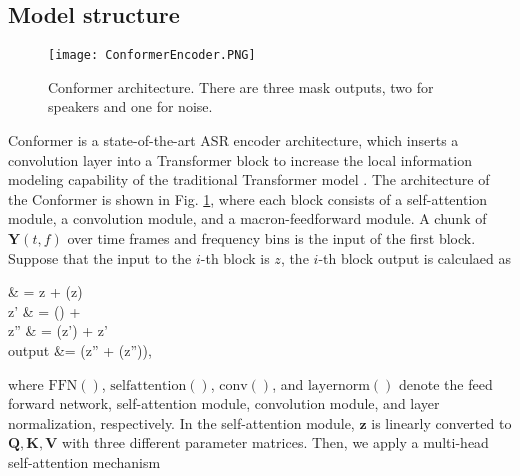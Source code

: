 \documentclass{article}
\begin{document}
	\subsection{Model structure}
	
	\begin{figure}[t]		
		\begin{center}
			\texttt{[image: ConformerEncoder.PNG]}
		\end{center}
		
		\caption{Conformer architecture. There are three mask outputs, two for speakers and one for noise.}\label{fig:conformer} 
		\vspace{-4.5mm}
		
	\end{figure} 
	
	Conformer \cite{gulati2020conformer} is a state-of-the-art ASR encoder architecture, which inserts a convolution layer into a Transformer block  to increase the local information modeling capability of the traditional Transformer model \cite{vaswani2017attention}. The architecture of the Conformer is shown in Fig. \ref{fig:conformer}, where each block consists of a self-attention module, a convolution module, and a macron-feedforward module. A chunk of $ \mathbf{Y}(t,f)$ over time frames and frequency bins is the input of the first block. Suppose that the input to the $i$-th block is $z$, the $i$-th block output is calculaed as
	\begin{flalign}
	 & = z + (z) \\
	z' & =  () +   \\
	z'' & =  (z') + z'\\
	output &=  (z'' + (z'')),
\end{flalign} where
	$\text{FFN}()$, $\text{selfattention}()$, $\text{conv}()$, and $\text{layernorm}()$ denote the feed forward network, self-attention module, convolution module, and layer normalization, respectively. 
	In the self-attention module, $\mathbf{\hat{z}}$ is linearly converted to $\mathbf{Q,K,V}$ with three different parameter matrices. Then, we apply a multi-head self-attention mechanism
	
\end{document}

